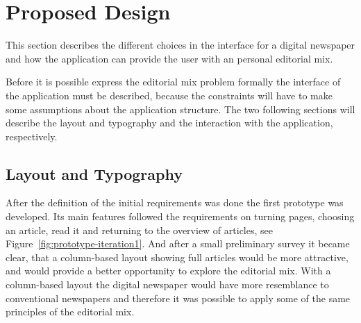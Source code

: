 \chapter{Proposed Design} %
\label{ch:design}
This section describes the different choices in the interface for a digital newspaper and how the application can provide the user with an personal editorial mix.

Before it is possible express the editorial mix problem formally the interface of the application must be described, because the constraints will have to make some assumptions about the application structure. The two following sections will describe the layout and typography and the interaction with the application, respectively.

\section{Layout and Typography}%
After the definition of the initial requirements was done the first prototype was developed. Its main features followed the requirements on turning pages, choosing an article, read it and returning to the overview of articles, see Figure~\ref{fig:prototype-iteration1}. And after a small preliminary survey it became clear, that a column-based layout showing full articles would be more attractive, and would provide a better opportunity to explore the editorial mix. With a column-based layout the digital newspaper would have more resemblance to conventional newspapers and therefore it was possible to apply some of the same principles of the editorial mix.
